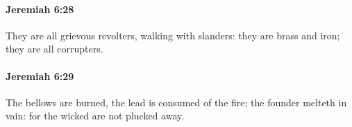 		\paragraph{Jeremiah 6:28} %
			\label{JEREMIAH-6-28}

			They are all grievous revolters, walking with slanders: they are brass and iron; they are all corrupters.


		\paragraph{Jeremiah 6:29} %
			\label{JEREMIAH-6-29}

			The bellows are burned, the lead is consumed of the fire; the founder melteth in vain: for the wicked are not plucked away.


